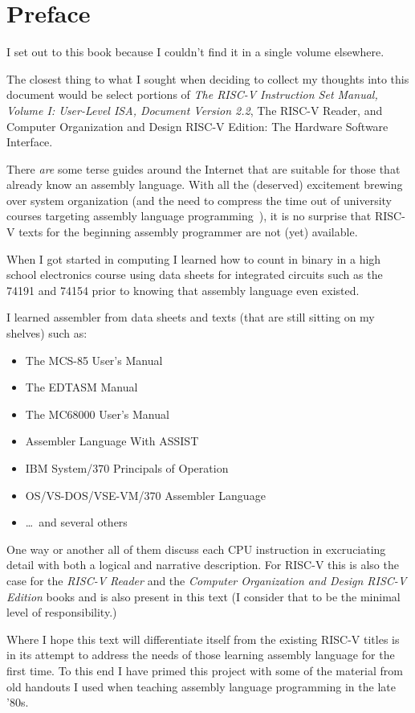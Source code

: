 \chapter{Preface}
\label{chapter:Preface}

I set out to this book because I couldn't find it in a single volume elsewhere.

The closest thing to what I sought when deciding to collect my thoughts
into this document would be select portions of 
{\em The RISC-V Instruction Set Manual, Volume I: User-Level ISA, Document Version 2.2}\cite{rvismv1v22:2017}, 
{The RISC-V Reader}\cite{riscvreader:2017}, and 
{Computer Organization and Design RISC-V Edition: The Hardware Software Interface}\cite{codriscv:2017}.

There {\em are} some terse guides around the Internet that are suitable 
for those that already know an assembly language.  With all the (deserved) 
excitement brewing over system organization (and the need to compress the 
time out of university courses targeting assembly language 
programming~\cite{Decker:1985:MAT:989369.989375}),
it is no surprise that RISC-V texts for the beginning assembly programmer 
are not (yet) available.

When I got started in computing I learned how to count in binary 
in a high school electronics course using data sheets for integrated 
circuits such as the 74191\cite{ttl74191:1979} and 74154\cite{ttl74154:1979} 
prior to knowing that assembly language even existed.

I learned assembler from data sheets and texts (that are still sitting on 
my shelves) such as:
\begin{itemize}
\item The MCS-85 User's Manual\cite{mcs85:1978}
\item The EDTASM Manual\cite{edtasm:1978}
\item The MC68000 User's Manual\cite{mc68000:1980}
\item Assembler Language With ASSIST\cite{assist:1983}
\item IBM System/370 Principals of Operation\cite{poo:1980}
\item OS/VS-DOS/VSE-VM/370 Assembler Language\cite{assembler370:1979}
\item \ldots\ and several others
\end{itemize}

One way or another all of them discuss each CPU instruction in excruciating detail 
with both a logical and narrative description.  For RISC-V this is 
also the case for the {\em RISC-V Reader}\cite{riscvreader:2017} and the 
{\em Computer Organization and Design RISC-V Edition}\cite{codriscv:2017} books
and is also present in this text (I consider that to be the minimal 
level of responsibility.)

Where I hope this text will differentiate itself from the existing RISC-V 
titles is in its attempt to address the needs of those learning assembly 
language for the first time.  To this end I have primed this project with 
some of the material from old handouts I used when teaching assembly language 
programming in the late '80s.
